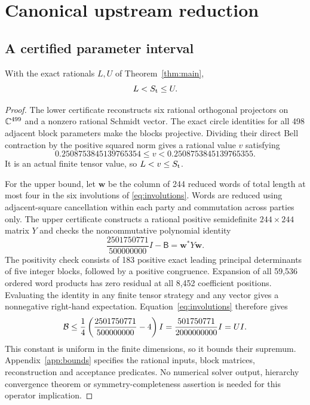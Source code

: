 \section{Canonical upstream reduction}\label{sec:upstream}
\subsection{A certified parameter interval}
\begin{proposition}\label{prop:R1}
With the exact rationals \(L,U\) of Theorem~\ref{thm:main},
\begin{equation}\label{eq:R1}
 L<S_{\mathrm t}\le U.
\end{equation}
\end{proposition}
\begin{proof}
The lower certificate reconstructs six rational orthogonal projectors on
\(\mathbb C^{499}\) and a nonzero rational Schmidt vector. The exact circle
identities for all 498 adjacent block parameters make the blocks projective.
Dividing their direct Bell contraction by the positive squared norm gives a
rational value \(v\) satisfying
\[
 0.2508753845139765354\le v
 <0.2508753845139765355.
\]
It is an actual finite tensor value, so \(L<v\le S_{\mathrm t}\).

For the upper bound, let \(\mathbf w\) be the column of 244 reduced words of
total length at most four in the six involutions of
\eqref{eq:involutions}. Words are reduced using adjacent-square cancellation
within each party and commutation across parties only. The upper certificate
constructs a rational positive semidefinite \(244\times244\) matrix \(Y\)
and checks the noncommutative polynomial identity
\begin{equation}\label{eq:upperidentity}
 \frac{2501750771}{500000000}I-\mathsf B
       =\mathbf w^*Y\mathbf w.
\end{equation}
The positivity check consists of 183 positive exact leading principal
determinants of five integer blocks, followed by a positive congruence.
Expansion of all 59,536 ordered word products has zero residual at all
8,452 coefficient positions. Evaluating the identity in any finite tensor
strategy and any vector gives a nonnegative right-hand expectation.
Equation~\eqref{eq:involutions} therefore gives
\[
 \mathcal B\le \frac14\left(\frac{2501750771}{500000000}-4\right)I
       =\frac{501750771}{2000000000}I=UI.
\]
This constant is uniform in the finite dimensions, so it bounds their
supremum. Appendix~\ref{app:bounds} specifies the rational inputs, block
matrices, reconstruction and acceptance predicates. No numerical solver
output, hierarchy convergence theorem or symmetry-completeness assertion is
needed for this operator implication.
\end{proof}

